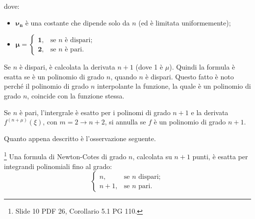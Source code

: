 

\noindent dove:
\begin{itemize}
    \item $\boldsymbol{\nu_n}$ è una costante che dipende solo da $n$ (ed è limitata uniformemente);
    \item $\boldsymbol{\mu}=
    \begin{cases}
        \boldsymbol 1, &\text{se $n$ è dispari;}\\
        \boldsymbol 2, &\text{se $n$ è pari.}
    \end{cases}$
\end{itemize}

Se $n$ è dispari, è calcolata la derivata $n+1$ (dove 1 è $\mu$). Quindi la formula è esatta se è un polinomio di grado $n$, quando $n$ è dispari. Questo fatto è noto perché il polinomio di grado $n$ interpolante la funzione, la quale è un polinomio di grado $n$, coincide con la funzione stessa.

Se $n$ è pari, l'intergrale è esatto per i polinomi di grado $n+1$ e la derivata $f^{(n+\mu)}(\xi)$, con $m=2\rightarrow n+2$, si annulla se $f$ è un polinomio di grado $n+1$.

Quanto appena descritto è l'osservazione seguente.

\begin{remark}
    \footnote{Slide 10 PDF 26, Corollario 5.1 PG 110.} Una formula di Newton-Cotes di grado $n$, calcolata su $n+1$ punti, è esatta per integrandi polinomiali fino al grado:
    \begin{equation*}
        \begin{cases}
            n, &\text{se $n$ dispari};\\
            n+1, &\text{se $n$ pari}.
        \end{cases}
    \end{equation*}
\end{remark}

